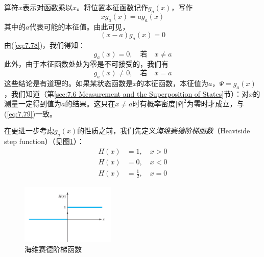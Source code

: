     算符$\hat{x}$表示对函数乘以$x$。将位置本征函数记作$g_a\left(x\right)$，写作
    \begin{equation}
        xg_a\left(x\right) = a g_a\left(x\right)
        \label{eq:7.77}
    \end{equation}
    其中的$a$代表可能的本征值。由此可见，
    \begin{equation}
        \left(x-a\right)g_a\left(x\right) = 0
        \label{eq:7.78}
    \end{equation}
    由(\ref{eq:7.78})，我们得知：
    \begin{equation}
        g_a\left(x\right) = 0, \quad \text{若} \quad x \neq a
        \label{eq:7.79}
    \end{equation}
    此外，由于本征函数处处为零是不可接受的，我们有
    \begin{equation}
        g_a\left(x\right) \neq 0, \quad \text{若} \quad x = a
        \label{eq:7.80}
    \end{equation}
    这些结论是有道理的。如果某状态函数是$\hat{x}$的本征函数，本征值为$a$，$\Psi = g_a\left(x\right)$，我们知道（第\ref{sec:7.6 Measurement and the Superposition of States}节）：对$x$的测量一定得到值为$a$的结果。这只在$x \neq a$时有概率密度$\left|\Psi\right|^2$为零时才成立，与(\ref{eq:7.79})一致。

    在更进一步考虑$g_a\left(x\right)$的性质之前，我们先定义\textit{海维赛德阶梯函数}（Heaviside step function）（见图\ref{fig:7.4}）：
    \begin{equation}
        \begin{aligned}
            H\left(x\right) & = 1, \quad x > 0 \\
            H\left(x\right) & = 0, \quad x < 0 \\
            H\left(x\right) & = \frac{1}{2}, \quad x = 0
        \end{aligned}
        \label{eq:7.81}
    \end{equation}
    \begin{figure}[h!]
        \centering
        \includegraphics[width=0.4\textwidth]{Figures/7.4.png}
        \caption{海维赛德阶梯函数}
        \label{fig:7.4}
    \end{figure}


